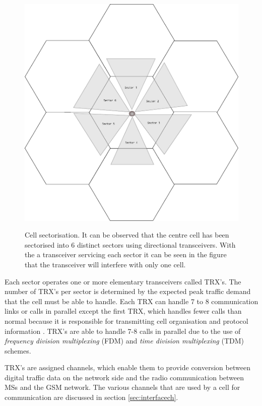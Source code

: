 \begin{figure}[t!]
	\begin{centering}
	\includegraphics[scale=0.75]{tikz-pics/cellsector.pdf}
	\label{fig:cellsector}
	\caption[Cell Sectorization]{Cell sectorisation. It can be observed that the centre cell has been sectorised into 6 distinct sectors using directional transceivers. With the a transceiver servicing each sector it can be seen in the figure that the transceiver will interfere with only one cell.}
	\end{centering}
\end{figure}

Each sector operates one or more elementary transceivers called TRX’s. The number of TRX’s per sector is determined by the expected peak traffic demand that the cell must be able to handle. Each TRX can handle 7 to 8 communication links or calls in parallel except the first TRX, which handles fewer calls than normal because it is responsible for transmitting cell organisation and protocol information \cite{Eisenblatter}. TRX’s are able to handle 7-8 calls in parallel due to the use of \emph{frequency division multiplexing} (FDM) and \emph{time division multiplexing} (TDM) schemes. 

TRX’s are assigned channels, which enable them to provide conversion between digital traffic data on the network side and the radio communication between MSs and the GSM network\cite{ACOvsEA,FAPOrientationModel}. The various channels that are used by a cell for communication are discussed in section \ref{sec:interfacech}.

